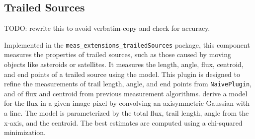 \subsection{Trailed Sources}
\label{sec:trailed-sources}

TODO: rewrite this to avoid verbatim-copy and check for accuracy.

Implemented in the \texttt{meas\_extensions\_trailed\-Sources} package, this component measures the properties of trailed sources, such as those caused by moving objects like asteroids or satellites.
It measures the length, angle, flux, centroid, and end points of a trailed source using the \citet{2012PASP..124.1197V} model.
This plugin is designed to refine the measurements of trail length, angle, and end points from \texttt{NaivePlugin}, and of flux and centroid from previous measurement algorithms.
\citet{2012PASP..124.1197V} derive a model for the flux in a given image pixel by convolving an axisymmetric Gaussian with a line.
The model is parameterized by the total flux, trail length, angle from the x-axis, and the centroid.
The best estimates are computed using a chi-squared minimization.

